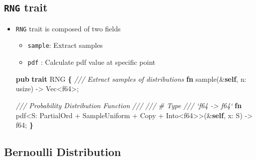 \documentclass[]{book}
\newenvironment{Shaded}{\begin{snugshade}}{\end{snugshade}}
\newcommand{\BuiltInTok}[1]{#1}
\newcommand{\CommentTok}[1]{\textcolor[rgb]{0.56,0.35,0.01}{\textit{#1}}}
\newcommand{\DataTypeTok}[1]{\textcolor[rgb]{0.13,0.29,0.53}{#1}}
\newcommand{\KeywordTok}[1]{\textcolor[rgb]{0.13,0.29,0.53}{\textbf{#1}}}
\newcommand{\NormalTok}[1]{#1}
\newcommand{\OperatorTok}[1]{\textcolor[rgb]{0.81,0.36,0.00}{\textbf{#1}}}
\providecommand{\tightlist}{%
  \setlength{\itemsep}{0pt}\setlength{\parskip}{0pt}}
\begin{document}
\hypertarget{rng-trait}{%
\subsection{\texorpdfstring{\texttt{RNG} trait}{RNG trait}}\label{rng-trait}}

\begin{itemize}
\tightlist
\item
  \texttt{RNG} trait is composed of two fields

  \begin{itemize}
  \tightlist
  \item
    \texttt{sample}: Extract samples
  \item
    \texttt{pdf} : Calculate pdf value at specific point
  \end{itemize}

\begin{Shaded}
\begin{Highlighting}[]
\KeywordTok{pub} \KeywordTok{trait}\NormalTok{ RNG }\OperatorTok{\{}
    \CommentTok{/// Extract samples of distributions}
    \KeywordTok{fn}\NormalTok{ sample(&}\KeywordTok{self}\NormalTok{, n: }\DataTypeTok{usize}\NormalTok{) -> }\DataTypeTok{Vec}\NormalTok{<}\DataTypeTok{f64}\NormalTok{>;}

    \CommentTok{/// Probability Distribution Function}
    \CommentTok{///}
    \CommentTok{/// # Type}
    \CommentTok{/// `f64 -> f64`}
    \KeywordTok{fn}\NormalTok{ pdf<S: }\BuiltInTok{PartialOrd}\NormalTok{ + SampleUniform + }\BuiltInTok{Copy}\NormalTok{ + }\BuiltInTok{Into}\NormalTok{<}\DataTypeTok{f64}\NormalTok{>>(&}\KeywordTok{self}\NormalTok{, x: S) -> }\DataTypeTok{f64}\NormalTok{;}
\OperatorTok{\}}
\end{Highlighting}
\end{Shaded}
\end{itemize}

\hypertarget{bernoulli-distribution}{%
\subsection{Bernoulli Distribution}\label{bernoulli-distribution}}
\end{document}
